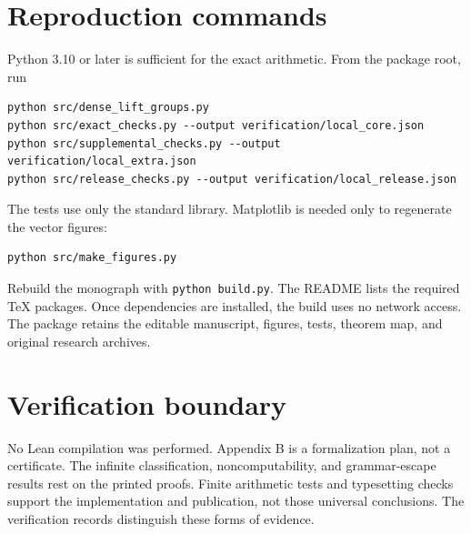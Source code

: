 \section{Reproduction commands}
Python 3.10 or later is sufficient for the exact arithmetic. From the package root, run
\begin{lstlisting}
python src/dense_lift_groups.py
python src/exact_checks.py --output verification/local_core.json
python src/supplemental_checks.py --output verification/local_extra.json
python src/release_checks.py --output verification/local_release.json
\end{lstlisting}
The tests use only the standard library. Matplotlib is needed only to regenerate the vector figures:
\begin{lstlisting}
python src/make_figures.py
\end{lstlisting}
Rebuild the monograph with \texttt{python build.py}. The README lists the required TeX packages. Once dependencies are installed, the build uses no network access. The package retains the editable manuscript, figures, tests, theorem map, and original research archives.

\section{Verification boundary}
No Lean compilation was performed. Appendix B is a formalization plan, not a certificate. The infinite classification, noncomputability, and grammar-escape results rest on the printed proofs. Finite arithmetic tests and typesetting checks support the implementation and publication, not those universal conclusions. The verification records distinguish these forms of evidence.
